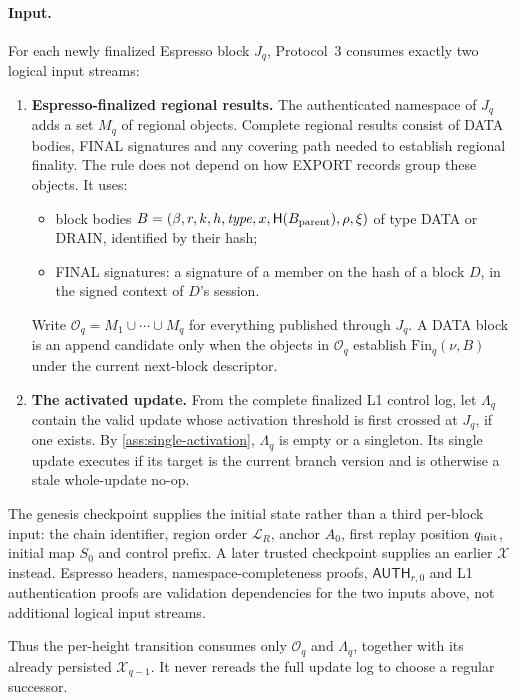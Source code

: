 \documentclass[11pt,a4paper]{article}
\newcommand{\Hash}{\mathsf H}
\newcommand{\tagg}[1]{\ensuremath{\mathsf{#1}}}
\begin{document}
\paragraph{Input.}
\label{sec:logical-carrier}
For each newly finalized Espresso block $J_q$, Protocol~3 consumes
exactly two logical input streams:
\begin{enumerate}[label=(I\arabic*),itemsep=2pt]
\item \textbf{Espresso-finalized regional results.}  The authenticated
namespace of $J_q$ adds a set $M_q$ of regional objects.  Complete
regional results consist of DATA bodies, FINAL signatures and any
covering path needed to establish regional finality.  The rule does not
depend on how EXPORT records group these objects.  It uses:
 \begin{itemize}[itemsep=1pt]
 \item block bodies
 $B=(\beta,r,k,h,\mathit{type},x,\Hash(B_{\rm parent}),\rho,\xi)$ of type
 DATA or DRAIN, identified by their hash;
 \item FINAL signatures: a signature of a member on the hash of a block
 $D$, in the signed context of $D$'s session.
 \end{itemize}
Write $\mathcal O_q=M_1\cup\cdots\cup M_q$ for everything published
through $J_q$. A DATA block is an append candidate only when the objects
in $\mathcal O_q$ establish $\mathrm{Fin}_q(\nu,B)$ under the current
next-block descriptor.
\item \textbf{The activated update.} From the complete finalized L1
control log, let $\Lambda_q$ contain the valid update whose activation
threshold is first crossed at $J_q$, if one exists. By
\cref{ass:single-activation}, $\Lambda_q$ is empty or a singleton. Its
single update executes if its target is the current branch version and
is otherwise a stale whole-update no-op.
\end{enumerate}
The genesis checkpoint supplies the initial state rather than a third
per-block input: the chain identifier, region order $\mathcal L_R$,
anchor $A_0$, first replay position $q_{\rm init}$, initial map $S_0$
and control prefix. A later trusted checkpoint supplies an earlier
$\mathcal X$ instead. Espresso headers, namespace-completeness
proofs, $\tagg{AUTH}_{r,0}$ and L1 authentication proofs are validation
dependencies for the two inputs above, not additional logical input
streams.

Thus the per-height transition consumes only $\mathcal O_q$ and
$\Lambda_q$, together with its already persisted $\mathcal X_{q-1}$.
It never rereads the full update log to choose a regular successor.
\end{document}
